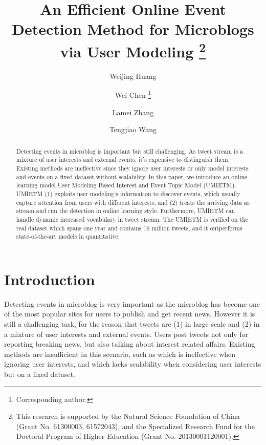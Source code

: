 \documentclass[runningheads,a4paper]{llncs}
\title{An Efficient Online Event Detection Method for Microblogs via User Modeling \thanks{This research is supported by the Natural Science Foundation of China (Grant No. 61300003, 61572043), and the Specialized Research Fund for the Doctoral Program of Higher Education (Grant No. 20130001120001).}}
\begin{document}
\author{Weijing Huang \and Wei Chen \thanks{Corresponding author.}\and Lamei Zhang\and Tengjiao Wang}
%
\maketitle
\thispagestyle{empty}
\pagestyle{empty}
%
%

\begin{abstract}
Detecting events in microblog is important but still challenging. As tweet stream is a mixture of user interests and external events, it’s expensive to distinguish them.
Existing methods are ineffective since they ignore user interests or only model interests and events on a fixed dataset without scalability. In this paper, we introduce an online learning model User Modeling Based Interest and Event Topic Model (UMIETM). UMIETM (1) exploits user modeling's information to discover events, which usually capture attention from users with different interests, and (2) treats the arriving data as stream and run the detection in online learning style. Furthermore, UMIETM can handle dynamic increased vocabulary in tweet stream. The UMIETM is verified on the real dataset which spans one year and contains 16 million tweets, and it outperforms state-of-the-art models in quantitative.
\end{abstract}
\section{Introduction}
Detecting events in microblog is very important as the microblog has become one of the most popular sites for users to publish and get recent news.
However it is still a challenging task, for the reason that tweets are (1) in large scale and (2) in a mixture of user interests and external events.
Users post tweets not only for reporting breaking news, but also talking about interest related affairs.
Existing methods are insufficient in this scenario, such as \cite{lau2012line} which is ineffective when ignoring user interests, and \cite{timeUserLDA2012finding} which lacks scalability when considering user interests but on a fixed dataset.
\end{document}
